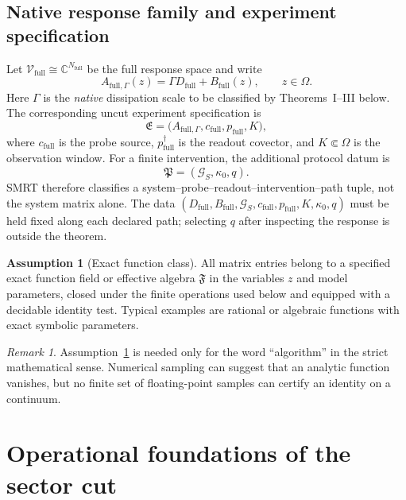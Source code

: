 \documentclass[11pt]{article}
\theoremstyle{definition}
\newtheorem{assumption}[theorem]{Assumption}
\theoremstyle{remark}
\newtheorem{remark}[theorem]{Remark}
\theoremstyle{plain}
\newcommand{\V}{\mathcal V}
\newcommand{\C}{\mathbb C}
\newcommand{\full}{\mathrm{full}}
\newcommand{\Gcut}{\mathcal G}
\newcommand{\ExpSpec}{\mathfrak E}
\newcommand{\PathSpec}{\mathfrak P}
\begin{document}
\subsection{Native response family and experiment specification}
Let $\V_{\full}\cong\C^{N_{\full}}$ be the full response space and write
\begin{equation}\label{eq:full-family}
  A_{\full,\Gamma}(z)=\Gamma D_{\full}+B_{\full}(z),
  \qquad z\in\Omega.
\end{equation}
Here $\Gamma$ is the \emph{native} dissipation scale to be classified by Theorems~I--III below.  The corresponding uncut experiment specification is
\begin{equation}\label{eq:experiment-specification}
  \ExpSpec=\bigl(A_{\full,\Gamma},c_{\full},p_{\full},K\bigr),
\end{equation}
where $c_{\full}$ is the probe source, $p_{\full}^{\dagger}$ is the readout covector, and $K\Subset\Omega$ is the observation window.  For a finite intervention, the additional protocol datum is
\begin{equation}\label{eq:path-specification}
 \PathSpec=(\Gcut_S,\kappa_0,q).
\end{equation}
SMRT therefore classifies a system--probe--readout--intervention--path tuple,
not the system matrix alone.  The data $(D_{\full},B_{\full},\Gcut_S,c_{\full},
p_{\full},K,\kappa_0,q)$ must be held fixed along each declared path; selecting
$q$ after inspecting the response is outside the theorem.

\begin{assumption}[Exact function class]\label{ass:exact}
All matrix entries belong to a specified exact function field or effective
algebra $\mathfrak F$ in the variables $z$ and model parameters, closed under
the finite operations used below and equipped with a decidable identity test.
Typical examples are rational or algebraic functions with exact symbolic
parameters.
\end{assumption}

\begin{remark}
Assumption~\ref{ass:exact} is needed only for the word ``algorithm'' in the
strict mathematical sense.  Numerical sampling can suggest that an analytic
function vanishes, but no finite set of floating-point samples can certify an
identity on a continuum.
\end{remark}

\section{Operational foundations of the sector cut}\label{sec:operational}
\end{document}
